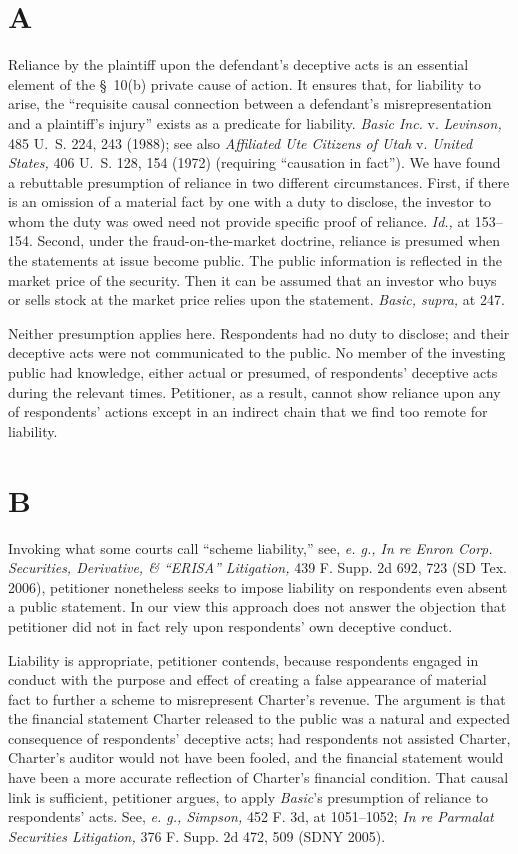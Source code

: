 \section{A}

  Reliance by the plaintiff upon the defendant's deceptive acts is an essential element of the \S~10(b) private cause of action. It ensures that, for liability to arise, the ``requisite causal connection between a defendant's misrepresentation and a plaintiff's injury'' exists as a predicate for liability. \emph{Basic Inc.} v. \emph{Levinson,} 485 U.~S. 224, 243 (1988); see also \emph{Affiliated Ute Citizens of Utah} v. \emph{United States,} 406 U.~S. 128, 154 (1972) (requiring ``causation in fact''). We have found a rebuttable presumption of reliance in two different circumstances. First, if there is an omission of a material fact by one with a duty to disclose, the investor to whom the duty was owed need not provide specific proof of reliance. \emph{Id.,} at 153--154. Second, under the fraud-on-the-market doctrine, reliance is presumed when the statements at issue become public. The public information is reflected in the market price of the security. Then it can be assumed that an investor who buys or sells stock at the market price relies upon the statement. \emph{Basic, supra,} at 247.

  Neither presumption applies here. Respondents had no duty to disclose; and their deceptive acts were not communicated to the public. No member of the investing public had knowledge, either actual or presumed, of respondents' deceptive acts during the relevant times. Petitioner, as a result, cannot show reliance upon any of respondents' actions except in an indirect chain that we find too remote for liability.

\section{B}

  Invoking what some courts call ``scheme liability,'' see, \emph{e. g., In re Enron Corp. Securities, Derivative, \& ``ERISA''} \emph{Litigation,} 439 F. Supp. 2d 692, 723 (SD Tex. 2006), peti\newpage tioner nonetheless seeks to impose liability on respondents even absent a public statement. In our view this approach does not answer the objection that petitioner did not in fact rely upon respondents' own deceptive conduct.

  Liability is appropriate, petitioner contends, because respondents engaged in conduct with the purpose and effect of creating a false appearance of material fact to further a scheme to misrepresent Charter's revenue. The argument is that the financial statement Charter released to the public was a natural and expected consequence of respondents' deceptive acts; had respondents not assisted Charter, Charter's auditor would not have been fooled, and the financial statement would have been a more accurate reflection of Charter's financial condition. That causal link is sufficient, petitioner argues, to apply \emph{Basic}'s presumption of reliance to respondents' acts. See, \emph{e. g., Simpson,} 452 F. 3d, at 1051--1052; \emph{In re Parmalat Securities Litigation,} 376 F. Supp. 2d 472, 509 (SDNY 2005).

